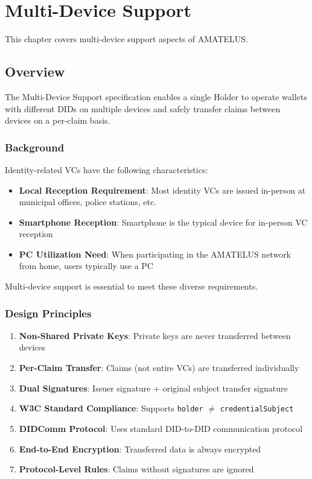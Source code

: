 \chapter{Multi-Device Support}


\begin{definition}
  \label{def:multi-chapter}
  This chapter covers multi-device support aspects of AMATELUS.
  \leanok
\end{definition}
\section{Overview}

The Multi-Device Support specification enables a single Holder to operate wallets with different DIDs on multiple devices and safely transfer claims between devices on a per-claim basis.

\subsection{Background}

Identity-related VCs have the following characteristics:

\begin{itemize}
  \item \textbf{Local Reception Requirement}: Most identity VCs are issued in-person at municipal offices, police stations, etc.
  \item \textbf{Smartphone Reception}: Smartphone is the typical device for in-person VC reception
  \item \textbf{PC Utilization Need}: When participating in the AMATELUS network from home, users typically use a PC
\end{itemize}

Multi-device support is essential to meet these diverse requirements.

\subsection{Design Principles}

\begin{enumerate}
  \item \textbf{Non-Shared Private Keys}: Private keys are never transferred between devices
  \item \textbf{Per-Claim Transfer}: Claims (not entire VCs) are transferred individually
  \item \textbf{Dual Signatures}: Issuer signature + original subject transfer signature
  \item \textbf{W3C Standard Compliance}: Supports \texttt{holder} $\neq$ \texttt{credentialSubject}
  \item \textbf{DIDComm Protocol}: Uses standard DID-to-DID communication protocol
  \item \textbf{End-to-End Encryption}: Transferred data is always encrypted
  \item \textbf{Protocol-Level Rules}: Claims without signatures are ignored
\end{enumerate}

